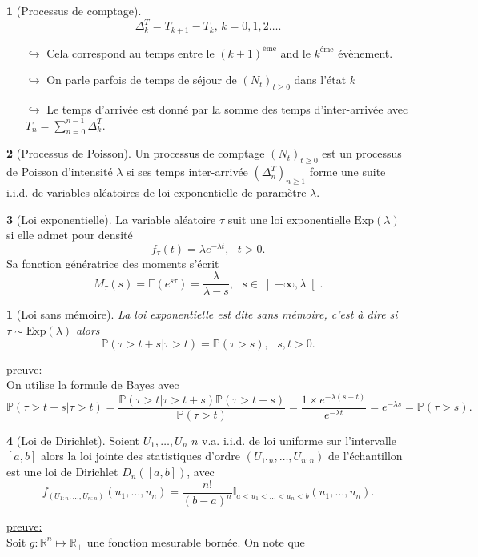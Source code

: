 \documentclass[8pt,notheorems]{beamer}
\def \E{\mathbb E}
\def \P {\mathbb P}
\newtheorem{prop}{\translate{Proposition}}
\theoremstyle{definition}
\newtheorem{definition}{\translate{Definition}}
\theoremstyle{example}
\theoremstyle{mystyle}
\theoremstyle{plain}
\begin{document}
\begin{frame}[allowframebreaks]
\begin{definition}[Processus de comptage]
$$\Delta^T_k=T_{k+1}-T_{k}\text{, }k=0,1,2\ldots.$$
\begin{itemize}
\item[$\hookrightarrow$] Cela correspond au temps entre le $(k+1)^{\text{éme}}$ and le  $k^{\text{éme}}$ évènement.
\item[$\hookrightarrow$] On parle parfois de temps de séjour de $(N_t)_{t\geq0}$ dans l'état $k$
\item[$\hookrightarrow$] Le temps d'arrivée est donné par la somme des temps d'inter-arrivée avec $T_n=\sum_{n=0}^{n-1}\Delta^T_k$.
\end{itemize}
\end{definition}
\begin{definition}[Processus de Poisson]
Un processus de comptage $(N_t)_{t\geq0}$ est un processus de Poisson d'intensité $\lambda$ si ses temps inter-arrivée $(\Delta^T_n)_{n\geq1}$ forme une suite i.i.d. de variables aléatoires de loi exponentielle de paramètre $\lambda$.
\end{definition}  
\begin{definition}[Loi exponentielle]
La variable aléatoire $\tau$ suit une loi exponentielle $\text{Exp}(\lambda)$ si elle admet pour densité
$$
f_{\tau}(t)=\lambda e^{-\lambda t},\text{ }t>0.
$$
Sa fonction génératrice des moments s'écrit
$$
M_{\tau}(s)=\E\left(e^{s\tau}\right)=\frac{\lambda}{\lambda-s},\text{ }s\in\left]-\infty,\lambda\right[.
$$
\end{definition}
\begin{prop}[Loi sans mémoire]
La loi exponentielle est dite sans mémoire, c'est à dire si $\tau\sim\text{Exp}(\lambda)$ alors
$$
\P(\tau>t+s|\tau>t)=\P(\tau>s),\text{ }s,t>0.
$$
\end{prop}
\underline{preuve:}\\
On utilise la formule de Bayes avec
$$
\P(\tau>t+s|\tau>t)=\frac{\P(\tau>t|\tau>t+s)\P(\tau>t+s)}{\P(\tau>t)}= \frac{1\times e^{-\lambda(s+t)}}{e^{-\lambda t}}=e^{-\lambda s}=\P(\tau>s).
$$
\begin{definition}[Loi de Dirichlet]
Soient $U_1,\ldots, U_n$ $n$ v.a. i.i.d. de loi uniforme sur l'intervalle $[a,b]$ alors la loi jointe des statistiques d'ordre $(U_{1:n},\ldots, U_{n:n})$ de l'échantillon est une loi de Dirichlet $D_n([a,b])$, avec
$$
f_{(U_{1:n},\ldots, U_{n:n})}(u_1,\ldots, u_n)=\frac{n!}{(b-a)^n}\mathbb{I}_{a<u_1<\ldots< u_n<b}(u_1,\ldots, u_n).
$$
\end{definition}
\underline{preuve:}\\
Soit $g:\mathbb{R}^n\mapsto \mathbb{R}_+$ une fonction mesurable bornée. On note que

\end{frame}
\end{document}

